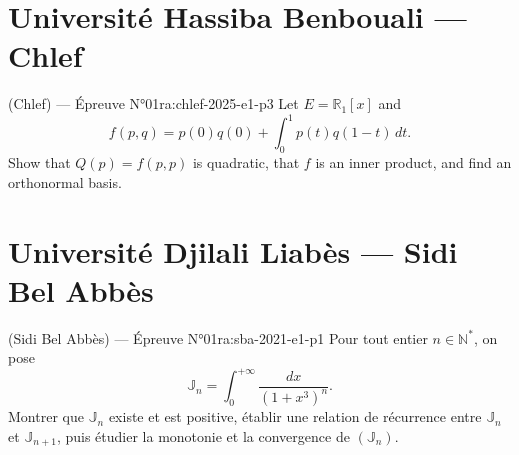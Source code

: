 \section{Université Hassiba Benbouali --- Chlef}
\begin{problem}{(Chlef) — Épreuve N°01}{ra:chlef-2025-e1-p3}
Let $E=\mathbb R_1[x]$ and
$$f(p,q)=p(0)q(0)+\int_0^1p(t)q(1-t)\,dt.$$
Show that $Q(p)=f(p,p)$ is quadratic, that $f$ is an inner product, and find an orthonormal basis.
\end{problem}
\newpage
\section{Université Djilali Liabès --- Sidi Bel Abbès}
\begin{problem}{(Sidi Bel Abbès) — Épreuve N°01}{ra:sba-2021-e1-p1}
Pour tout entier $n\in\mathbb N^*$, on pose
$$\mathbb J_n=\int_0^{+\infty}\frac{dx}{(1+x^3)^n}.$$
Montrer que $\mathbb J_n$ existe et est positive, établir une relation de récurrence entre $\mathbb J_n$ et $\mathbb J_{n+1}$, puis étudier la monotonie et la convergence de $(\mathbb J_n)$.
\end{problem}
